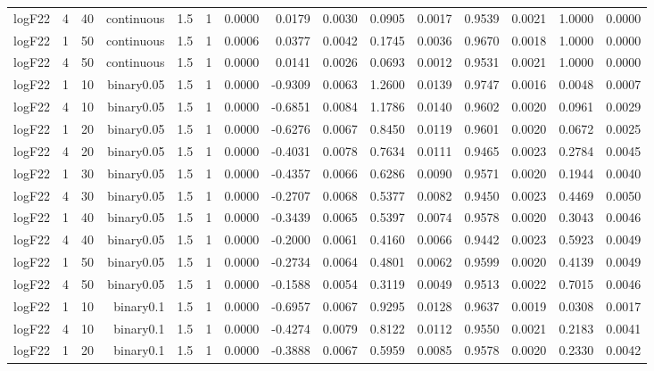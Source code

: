 \begin{longtable}{rrrrrrrrrrrrrrr}
  logF22 & 4 & 40 & continuous & 1.5 & 1 & 0.0000 & 0.0179 & 0.0030 & 0.0905 & 0.0017 & 0.9539 & 0.0021 & 1.0000 & 0.0000 \\ 
  logF22 & 1 & 50 & continuous & 1.5 & 1 & 0.0006 & 0.0377 & 0.0042 & 0.1745 & 0.0036 & 0.9670 & 0.0018 & 1.0000 & 0.0000 \\ 
  logF22 & 4 & 50 & continuous & 1.5 & 1 & 0.0000 & 0.0141 & 0.0026 & 0.0693 & 0.0012 & 0.9531 & 0.0021 & 1.0000 & 0.0000 \\ 
  logF22 & 1 & 10 & binary0.05 & 1.5 & 1 & 0.0000 & -0.9309 & 0.0063 & 1.2600 & 0.0139 & 0.9747 & 0.0016 & 0.0048 & 0.0007 \\ 
  logF22 & 4 & 10 & binary0.05 & 1.5 & 1 & 0.0000 & -0.6851 & 0.0084 & 1.1786 & 0.0140 & 0.9602 & 0.0020 & 0.0961 & 0.0029 \\ 
  logF22 & 1 & 20 & binary0.05 & 1.5 & 1 & 0.0000 & -0.6276 & 0.0067 & 0.8450 & 0.0119 & 0.9601 & 0.0020 & 0.0672 & 0.0025 \\ 
  logF22 & 4 & 20 & binary0.05 & 1.5 & 1 & 0.0000 & -0.4031 & 0.0078 & 0.7634 & 0.0111 & 0.9465 & 0.0023 & 0.2784 & 0.0045 \\ 
  logF22 & 1 & 30 & binary0.05 & 1.5 & 1 & 0.0000 & -0.4357 & 0.0066 & 0.6286 & 0.0090 & 0.9571 & 0.0020 & 0.1944 & 0.0040 \\ 
  logF22 & 4 & 30 & binary0.05 & 1.5 & 1 & 0.0000 & -0.2707 & 0.0068 & 0.5377 & 0.0082 & 0.9450 & 0.0023 & 0.4469 & 0.0050 \\ 
  logF22 & 1 & 40 & binary0.05 & 1.5 & 1 & 0.0000 & -0.3439 & 0.0065 & 0.5397 & 0.0074 & 0.9578 & 0.0020 & 0.3043 & 0.0046 \\ 
  logF22 & 4 & 40 & binary0.05 & 1.5 & 1 & 0.0000 & -0.2000 & 0.0061 & 0.4160 & 0.0066 & 0.9442 & 0.0023 & 0.5923 & 0.0049 \\ 
  logF22 & 1 & 50 & binary0.05 & 1.5 & 1 & 0.0000 & -0.2734 & 0.0064 & 0.4801 & 0.0062 & 0.9599 & 0.0020 & 0.4139 & 0.0049 \\ 
  logF22 & 4 & 50 & binary0.05 & 1.5 & 1 & 0.0000 & -0.1588 & 0.0054 & 0.3119 & 0.0049 & 0.9513 & 0.0022 & 0.7015 & 0.0046 \\ 
  logF22 & 1 & 10 & binary0.1 & 1.5 & 1 & 0.0000 & -0.6957 & 0.0067 & 0.9295 & 0.0128 & 0.9637 & 0.0019 & 0.0308 & 0.0017 \\ 
  logF22 & 4 & 10 & binary0.1 & 1.5 & 1 & 0.0000 & -0.4274 & 0.0079 & 0.8122 & 0.0112 & 0.9550 & 0.0021 & 0.2183 & 0.0041 \\ 
  logF22 & 1 & 20 & binary0.1 & 1.5 & 1 & 0.0000 & -0.3888 & 0.0067 & 0.5959 & 0.0085 & 0.9578 & 0.0020 & 0.2330 & 0.0042 \\ 

\end{longtable}

